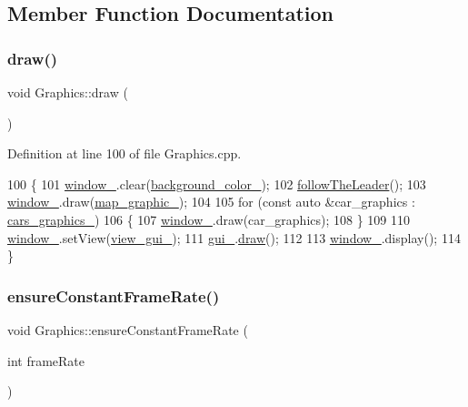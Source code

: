 \subsection{Member Function Documentation}
\mbox{\label{classGraphics_ad0e7c12771870690d603e9df6643542c}} 
\subsubsection{\texorpdfstring{draw()}{draw()}}
{\footnotesize\ttfamily void Graphics\+::draw (\begin{DoxyParamCaption}{ }\end{DoxyParamCaption})}



Definition at line 100 of file Graphics.\+cpp.


\begin{DoxyCode}
100                     \{
101     \hyperlink{classGraphics_ac760fe1abb0b648844c9f15afa087ef6}{window\_}.clear(\hyperlink{classGraphics_a44d7a76a58e03b8ad3f025123894c526}{background\_color\_});
102     \hyperlink{classGraphics_ad3718f2541f28115865058823113f5cd}{followTheLeader}();
103     \hyperlink{classGraphics_ac760fe1abb0b648844c9f15afa087ef6}{window\_}.draw(\hyperlink{classGraphics_a7b3e98774ea965783584d5351c730276}{map\_graphic\_});
104 
105     \textcolor{keywordflow}{for} (\textcolor{keyword}{const} \textcolor{keyword}{auto} &car\_graphics : \hyperlink{classGraphics_a8be356ffe3ee47f915027361b6ae34ab}{cars\_graphics\_})
106     \{
107         \hyperlink{classGraphics_ac760fe1abb0b648844c9f15afa087ef6}{window\_}.draw(car\_graphics);
108     \}
109 
110     \hyperlink{classGraphics_ac760fe1abb0b648844c9f15afa087ef6}{window\_}.setView(\hyperlink{classGraphics_aaca5b237fae17f3166f8f28e4c363e06}{view\_gui\_});
111     \hyperlink{classGraphics_ac582857f6b0de010eabd0146c4a5f4d2}{gui\_}.\hyperlink{classGraphicalUserInterface_a268c54faf6a8ac32628c60495900ea1c}{draw}();
112 
113     \hyperlink{classGraphics_ac760fe1abb0b648844c9f15afa087ef6}{window\_}.display();
114 \}
\end{DoxyCode}
\mbox{\label{classGraphics_a283310b7fe274dab0544d307525198dc}} 
\subsubsection{\texorpdfstring{ensure\+Constant\+Frame\+Rate()}{ensureConstantFrameRate()}}
{\footnotesize\ttfamily void Graphics\+::ensure\+Constant\+Frame\+Rate (\begin{DoxyParamCaption}\item[{int}]{frame\+Rate }\end{DoxyParamCaption})}



